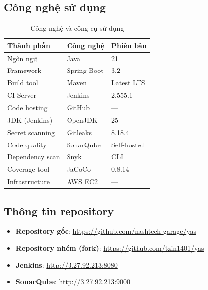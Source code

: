 \subsection{Công nghệ sử dụng}
\begin{table}[H]
\centering
\caption{Công nghệ và công cụ sử dụng}
\begin{tabular}{|l|l|l|}
\hline
\textbf{Thành phần} & \textbf{Công nghệ} & \textbf{Phiên bản} \\
\hline
Ngôn ngữ & Java & 21 \\
\hline
Framework & Spring Boot & 3.2 \\
\hline
Build tool & Maven & Latest LTS \\
\hline
CI Server & Jenkins & 2.555.1 \\
\hline
Code hosting & GitHub & --- \\
\hline
JDK (Jenkins) & OpenJDK & 25 \\
\hline
Secret scanning & Gitleaks & 8.18.4 \\
\hline
Code quality & SonarQube & Self-hosted \\
\hline
Dependency scan & Snyk & CLI \\
\hline
Coverage tool & JaCoCo & 0.8.14 \\
\hline
Infrastructure & AWS EC2 & --- \\
\hline
\end{tabular}
\end{table}

\subsection{Thông tin repository}
\begin{itemize}[noitemsep]
    \item \textbf{Repository gốc}: \url{https://github.com/nashtech-garage/yas}
    \item \textbf{Repository nhóm (fork)}: \url{https://github.com/tzin1401/yas}
    \item \textbf{Jenkins}: \url{http://3.27.92.213:8080}
    \item \textbf{SonarQube}: \url{http://3.27.92.213:9000}
\end{itemize}
